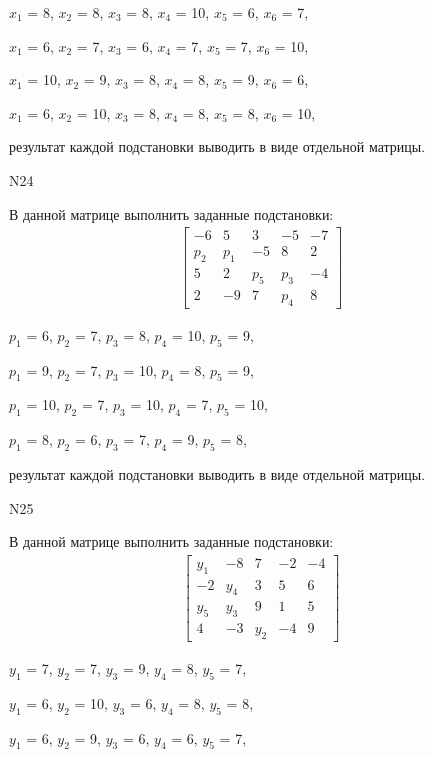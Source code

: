 \documentclass[11pt]{report}
\begin{document}
$x_{1}$ = 8, $x_{2}$ = 8, $x_{3}$ = 8, $x_{4}$ = 10, $x_{5}$ = 6, $x_{6}$ = 7, 

$x_{1}$ = 6, $x_{2}$ = 7, $x_{3}$ = 6, $x_{4}$ = 7, $x_{5}$ = 7, $x_{6}$ = 10, 

$x_{1}$ = 10, $x_{2}$ = 9, $x_{3}$ = 8, $x_{4}$ = 8, $x_{5}$ = 9, $x_{6}$ = 6, 

$x_{1}$ = 6, $x_{2}$ = 10, $x_{3}$ = 8, $x_{4}$ = 8, $x_{5}$ = 8, $x_{6}$ = 10, 

результат каждой подстановки выводить в виде отдельной матрицы.

N24

В данной матрице выполнить заданные подстановки:
\begin{align*}
\left[\begin{matrix}-6 & 5 & 3 & -5 & -7\\p_{2} & p_{1} & -5 & 8 & 2\\5 & 2 & p_{5} & p_{3} & -4\\2 & -9 & 7 & p_{4} & 8\end{matrix}\right]
\end{align*}


$p_{1}$ = 6, $p_{2}$ = 7, $p_{3}$ = 8, $p_{4}$ = 10, $p_{5}$ = 9, 

$p_{1}$ = 9, $p_{2}$ = 7, $p_{3}$ = 10, $p_{4}$ = 8, $p_{5}$ = 9, 

$p_{1}$ = 10, $p_{2}$ = 7, $p_{3}$ = 10, $p_{4}$ = 7, $p_{5}$ = 10, 

$p_{1}$ = 8, $p_{2}$ = 6, $p_{3}$ = 7, $p_{4}$ = 9, $p_{5}$ = 8, 

результат каждой подстановки выводить в виде отдельной матрицы.

N25

В данной матрице выполнить заданные подстановки:
\begin{align*}
\left[\begin{matrix}y_{1} & -8 & 7 & -2 & -4\\-2 & y_{4} & 3 & 5 & 6\\y_{5} & y_{3} & 9 & 1 & 5\\4 & -3 & y_{2} & -4 & 9\end{matrix}\right]
\end{align*}


$y_{1}$ = 7, $y_{2}$ = 7, $y_{3}$ = 9, $y_{4}$ = 8, $y_{5}$ = 7, 

$y_{1}$ = 6, $y_{2}$ = 10, $y_{3}$ = 6, $y_{4}$ = 8, $y_{5}$ = 8, 

$y_{1}$ = 6, $y_{2}$ = 9, $y_{3}$ = 6, $y_{4}$ = 6, $y_{5}$ = 7, 
\end{document}
